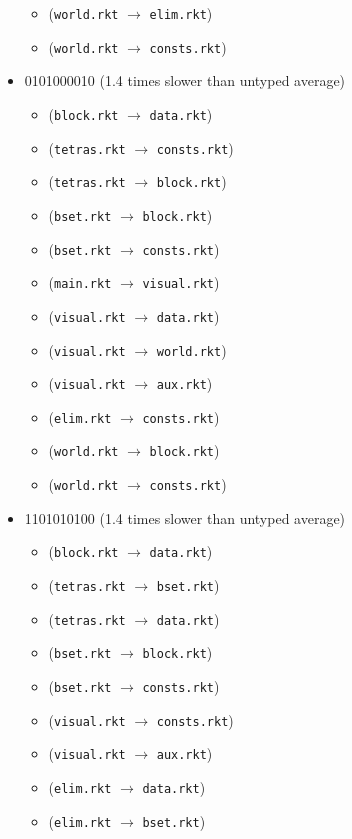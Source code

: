 \documentclass{article}
\newcommand{\mono}[1]{\texttt{#1}}
\begin{document}
\begin{itemize}
\begin{itemize}
  \item (\mono{world.rkt} $\rightarrow$ \mono{elim.rkt})
  \item (\mono{world.rkt} $\rightarrow$ \mono{consts.rkt})
  \end{itemize}
\item 0101000010 (1.4 times slower than untyped average)
  \begin{itemize}
  \item (\mono{block.rkt} $\rightarrow$ \mono{data.rkt})
  \item (\mono{tetras.rkt} $\rightarrow$ \mono{consts.rkt})
  \item (\mono{tetras.rkt} $\rightarrow$ \mono{block.rkt})
  \item (\mono{bset.rkt} $\rightarrow$ \mono{block.rkt})
  \item (\mono{bset.rkt} $\rightarrow$ \mono{consts.rkt})
  \item (\mono{main.rkt} $\rightarrow$ \mono{visual.rkt})
  \item (\mono{visual.rkt} $\rightarrow$ \mono{data.rkt})
  \item (\mono{visual.rkt} $\rightarrow$ \mono{world.rkt})
  \item (\mono{visual.rkt} $\rightarrow$ \mono{aux.rkt})
  \item (\mono{elim.rkt} $\rightarrow$ \mono{consts.rkt})
  \item (\mono{world.rkt} $\rightarrow$ \mono{block.rkt})
  \item (\mono{world.rkt} $\rightarrow$ \mono{consts.rkt})
  \end{itemize}
\item 1101010100 (1.4 times slower than untyped average)
  \begin{itemize}
  \item (\mono{block.rkt} $\rightarrow$ \mono{data.rkt})
  \item (\mono{tetras.rkt} $\rightarrow$ \mono{bset.rkt})
  \item (\mono{tetras.rkt} $\rightarrow$ \mono{data.rkt})
  \item (\mono{bset.rkt} $\rightarrow$ \mono{block.rkt})
  \item (\mono{bset.rkt} $\rightarrow$ \mono{consts.rkt})
  \item (\mono{visual.rkt} $\rightarrow$ \mono{consts.rkt})
  \item (\mono{visual.rkt} $\rightarrow$ \mono{aux.rkt})
  \item (\mono{elim.rkt} $\rightarrow$ \mono{data.rkt})
  \item (\mono{elim.rkt} $\rightarrow$ \mono{bset.rkt})

\end{itemize}
\end{itemize}
\end{document}
